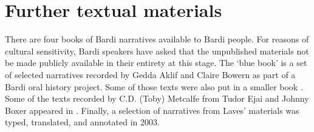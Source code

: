 \section*{Further textual materials}
There are four books of Bardi narratives available to Bardi people. For reasons of cultural sensitivity, Bardi speakers have asked that the unpublished materials not be made publicly available in their entirety at this stage. The `blue book' \citep{bow02jnj} is a set of selected narratives recorded by Gedda Aklif and Claire Bowern as part of a Bardi oral history project. Some of those texts were also put in a smaller book \citep{jawal}. Some of the texts recorded by C.D. (Toby) Metcalfe from Tudor Ejai and Johnny Boxer appeared in \citet{hersut86}. Finally, a selection of narratives from Laves' materials was typed, translated, and annotated in 2003. 
